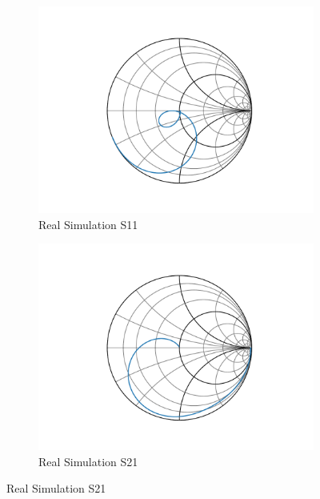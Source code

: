 \documentclass[letterpaper,12pt]{article}
\begin{document}
\begin{figure}[H]
    \begin{subfigure}[t]{.49\textwidth}
      \centering
      \includegraphics[width=\linewidth]{figures/8.s11.real}
      \caption{Real Simulation S11}
    \end{subfigure}
    \hfill
    \begin{subfigure}[t]{.49\textwidth}
      \centering
      \includegraphics[width=\linewidth]{figures/8.s21.real}
      \caption{Real Simulation S21}
    \end{subfigure}
  
    \medskip
  

\end{figure}
\end{document}
